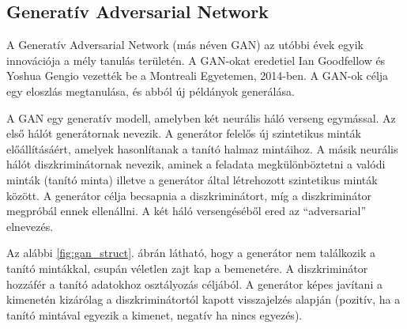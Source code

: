 
\subsection{Generatív Adversarial Network}

A Generatív Adversarial Network (más néven GAN) az utóbbi évek egyik innovációja a mély tanulás területén. A GAN-okat eredetiel Ian Goodfellow és Yoshua Gengio vezették be a Montreali Egyetemen, 2014-ben. A GAN-ok célja egy eloszlás megtanulása, és abból új példányok generálása.

A GAN egy generatív modell, amelyben két neurális háló verseng egymással. Az első hálót generátornak nevezik. A generátor felelős új szintetikus minták előállításáért, amelyek hasonlítanak a tanító halmaz mintáihoz. A másik neurális hálót diszkriminátornak nevezik, aminek a feladata megkülönböztetni a valódi minták (tanító minta) illetve a generátor által létrehozott szintetikus minták között. A generátor célja becsapnia a diszkriminátort, míg a diszkriminátor megpróbál ennek ellenállni. A két háló versengéséből ered az ``adversarial'' elnevezés.

Az alábbi \ref{fig:gan_struct}. ábrán látható, hogy a generátor nem találkozik a tanító mintákkal, csupán véletlen zajt kap a bemenetére. A diszkriminátor hozzáfér a tanító adatokhoz osztályozás céljából. A generátor képes javítani a kimenetén kizárólag a diszkriminátortól kapott visszajelzés alapján (pozitív, ha a tanító mintával egyezik a kimenet, negatív ha nincs egyezés).



